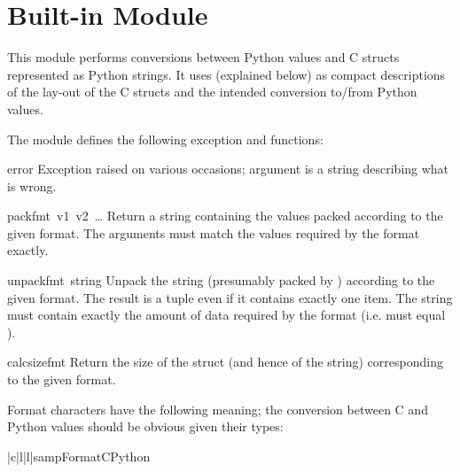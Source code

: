 \section{Built-in Module }

This module performs conversions between Python values and C
structs represented as Python strings.  It uses 
(explained below) as compact descriptions of the lay-out of the C
structs and the intended conversion to/from Python values.

The module defines the following exception and functions:

\renewcommand{\indexsubitem}{(in module struct)}
\begin{excdesc}{error}
  Exception raised on various occasions; argument is a string
  describing what is wrong.
\end{excdesc}

\begin{funcdesc}{pack}{fmt\, v1\, v2\, {\rm \ldots}}
  Return a string containing the values
   packed according to the given
  format.  The arguments must match the values required by the format
  exactly.
\end{funcdesc}

\begin{funcdesc}{unpack}{fmt\, string}
  Unpack the string (presumably packed by )
  according to the given format.  The result is a tuple even if it
  contains exactly one item.  The string must contain exactly the
  amount of data required by the format (i.e.   must
  equal ).
\end{funcdesc}

\begin{funcdesc}{calcsize}{fmt}
  Return the size of the struct (and hence of the string)
  corresponding to the given format.
\end{funcdesc}

Format characters have the following meaning; the conversion between C
and Python values should be obvious given their types:

\begin{tableiii}{|c|l|l|}{samp}{Format}{C}{Python}
\end{tableiii}

